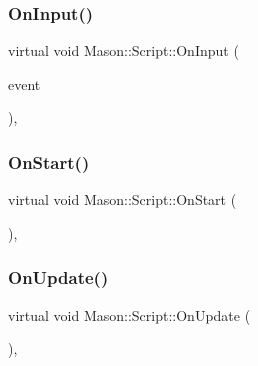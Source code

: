 \hypertarget{class_mason_1_1_script_a84fff8072c4e8b56fb242b29f3491224}{}\label{class_mason_1_1_script_a84fff8072c4e8b56fb242b29f3491224} 
\subsubsection{\texorpdfstring{On\+Input()}{OnInput()}}
{\footnotesize\ttfamily virtual void Mason\+::\+Script\+::\+On\+Input (\begin{DoxyParamCaption}\item[{S\+D\+L\+\_\+\+Event}]{event }\end{DoxyParamCaption})\hspace{0.3cm}{\ttfamily [inline]}, {\ttfamily [virtual]}}

\hypertarget{class_mason_1_1_script_aa42915c752bb7f4623ca679b222edf2f}{}\label{class_mason_1_1_script_aa42915c752bb7f4623ca679b222edf2f} 
\subsubsection{\texorpdfstring{On\+Start()}{OnStart()}}
{\footnotesize\ttfamily virtual void Mason\+::\+Script\+::\+On\+Start (\begin{DoxyParamCaption}{ }\end{DoxyParamCaption})\hspace{0.3cm}{\ttfamily [inline]}, {\ttfamily [virtual]}}

\hypertarget{class_mason_1_1_script_acafa4283460fb677484bb43ebec37743}{}\label{class_mason_1_1_script_acafa4283460fb677484bb43ebec37743} 
\subsubsection{\texorpdfstring{On\+Update()}{OnUpdate()}}
{\footnotesize\ttfamily virtual void Mason\+::\+Script\+::\+On\+Update (\begin{DoxyParamCaption}{ }\end{DoxyParamCaption})\hspace{0.3cm}{\ttfamily [inline]}, {\ttfamily [virtual]}}



